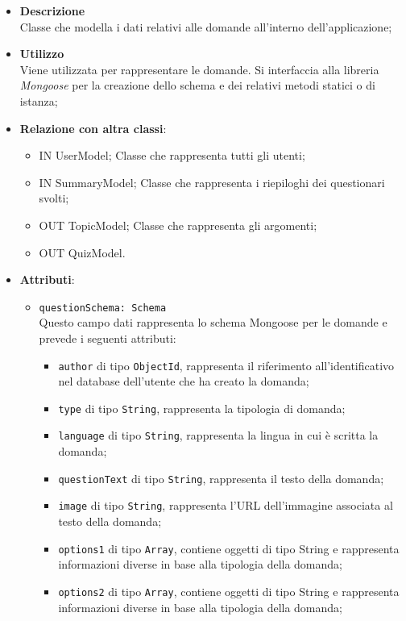 	\begin{itemize}
		\item \textbf{Descrizione} \\
		Classe che modella i dati relativi alle domande all'interno dell'applicazione;	
		\item \textbf{Utilizzo} \\
		Viene utilizzata per rappresentare le domande. Si interfaccia alla libreria \textit{Mongoose} per la creazione dello schema e dei relativi metodi statici o di istanza;
		\item \textbf{Relazione con altra classi}:
			\begin{itemize}
			\item IN UserModel;
			Classe che rappresenta tutti gli utenti;
			\item IN SummaryModel;
			Classe che rappresenta i riepiloghi dei questionari svolti;
			\item OUT TopicModel;
			Classe che rappresenta gli argomenti;
			\item OUT QuizModel.
			\end{itemize}
		\item \textbf{Attributi}:
	\begin{itemize}
		\item \texttt{questionSchema: Schema} \\
		Questo campo dati rappresenta lo schema Mongoose per le domande e prevede i seguenti attributi:
		\begin{itemize}
			\item \texttt{author} di tipo \texttt{ObjectId}, rappresenta il riferimento all'identificativo nel database dell'utente che ha creato la domanda;
			\item \texttt{type} di tipo \texttt{String}, rappresenta la tipologia di domanda;
			\item \texttt{language} di tipo \texttt{String}, rappresenta la lingua in cui è scritta la domanda; 
			\item \texttt{questionText} di tipo \texttt{String}, rappresenta il testo della domanda; 
			\item \texttt{image} di tipo \texttt{String}, rappresenta l'URL dell'immagine associata al testo della domanda;
			\item \texttt{options1} di tipo \texttt{Array}, contiene oggetti di tipo String e rappresenta informazioni diverse in base alla tipologia della domanda;
			\item \texttt{options2} di tipo \texttt{Array}, contiene oggetti di tipo String e rappresenta informazioni diverse in base alla tipologia della domanda;

\end{itemize}
\end{itemize}
\end{itemize}
